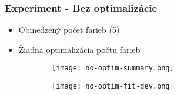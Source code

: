 \begin{frame}
	\frametitle{Experiment - Bez optimalizácie}
	\begin{itemize}
		\item Obmedzený počet farieb (5)
		\item Žiadna optimalizácia počtu farieb
	\end{itemize}
\begin{table}
	\caption{Agregované výsledky 100 behov na grafe \emph{1-FullIns4}\footnote{Link to Graph}}
\end{table}

\begin{figure}
	\begin{subfigure}{.5\textwidth}
		\texttt{[image: no-optim-summary.png]}
	\end{subfigure}%
	\begin{subfigure}{.5\textwidth}
		\texttt{[image: no-optim-fit-dev.png]}
	\end{subfigure}
	
\end{figure}
	
\end{frame}

